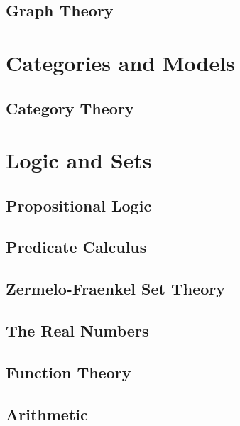 \documentclass{book}                                                           %
\newcommand*{\TOPPATH}{books}
\newcommand*{\PARPATH}{\TOPPATH/}
\newcommand*{\PATH}{\TOPPATH/}
\begin{document}
            \chapter{Graph Theory}
                \renewcommand{\PATH}{\PARPATH/Graph_Theory}
                \label{chapt:Graph_Theory}%
                
        \part{Categories and Models}
            \renewcommand{\PARPATH}{\TOPPATH/Foundations/Categories_and_Models}
            \chapter{Category Theory}
                \renewcommand{\PATH}{\PARPATH}
                \label{chapt:Category_Theory}%
                
    \else
        \part{Logic and Sets}
            \chapter{Propositional Logic}
                \label{chapt:Propositional_Logic}%
            \chapter{Predicate Calculus}
                \label{chapt:Predicate_Calculus}%
            \chapter{Zermelo-Fraenkel Set Theory}
                \label{chapt:Zermelo_Fraenkel_Set_Theory}%
            \chapter{The Real Numbers}
                \label{chapt:The_Real_Numbers}%
            \chapter{Function Theory}
                \label{chapt:Function_Theory}%
            \chapter{Arithmetic}
                \label{chapt:Arithmetic}%
\end{document}

